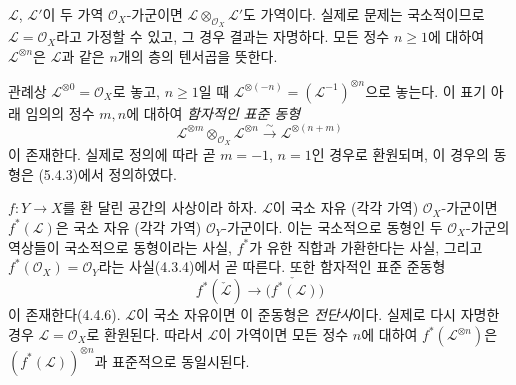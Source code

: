 \begin{env}[5.4.4]
\label{0.5.4.4-ko}
$\mathcal L$, $\mathcal L'$이 두 가역 $\mathcal O_X$-가군이면
$\mathcal L\otimes_{\mathcal O_X}\mathcal L'$도 가역이다. 실제로
문제는 국소적이므로 $\mathcal L=\mathcal O_X$라고 가정할 수 있고,
그 경우 결과는 자명하다. 모든 정수 $n\geq1$에 대하여
$\mathcal L^{\otimes n}$은 $\mathcal L$과 같은 $n$개의 층의
텐서곱을 뜻한다.


관례상 $\mathcal L^{\otimes0}=\mathcal O_X$로 놓고, $n\geq1$일 때
$\mathcal L^{\otimes(-n)}=(\mathcal L^{-1})^{\otimes n}$으로 놓는다.
이 표기 아래 임의의 정수 $m,n$에 대하여 \emph{함자적인 표준 동형}
\[
  \mathcal L^{\otimes m}\otimes_{\mathcal O_X}\mathcal L^{\otimes n}
  \xrightarrow{\sim}
  \mathcal L^{\otimes(n+m)}
  \tag{5.4.4.1}\label{0.5.4.4.1-ko}
\]
이 존재한다. 실제로 정의에 따라 곧 $m=-1$, $n=1$인 경우로
환원되며, 이 경우의 동형은 (5.4.3)에서 정의하였다.
\end{env}

\begin{env}[5.4.5]
\label{0.5.4.5-ko}
$f:Y\to X$를 환 달린 공간의 사상이라 하자. $\mathcal L$이 국소 자유
(각각 가역) $\mathcal O_X$-가군이면 $f^*(\mathcal L)$은 국소 자유
(각각 가역) $\mathcal O_Y$-가군이다. 이는 국소적으로 동형인 두
$\mathcal O_X$-가군의 역상들이 국소적으로 동형이라는 사실,
$f^*$가 유한 직합과 가환한다는 사실, 그리고
$f^*(\mathcal O_X)=\mathcal O_Y$라는 사실(4.3.4)에서 곧 따른다.
또한 함자적인 표준 준동형
\[
  f^*(\check{\mathcal L})
  \longrightarrow
  \check{\bigl(f^*(\mathcal L)\bigr)}
\]
이 존재한다(4.4.6). $\mathcal L$이 국소 자유이면 이 준동형은
\emph{전단사}이다. 실제로 다시 자명한 경우
$\mathcal L=\mathcal O_X$로 환원된다. 따라서 $\mathcal L$이
가역이면 모든 정수 $n$에 대하여 $f^*(\mathcal L^{\otimes n})$은
$(f^*(\mathcal L))^{\otimes n}$과 표준적으로 동일시된다.
\end{env}

